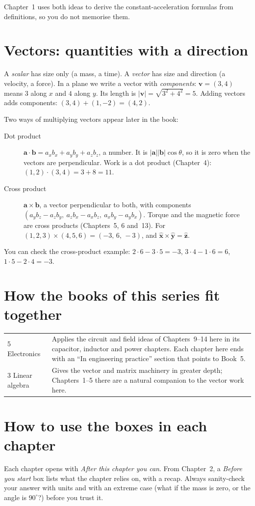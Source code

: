 Chapter~1 uses both ideas to derive the constant-acceleration formulas from
definitions, so you do not memorise them.

\section*{Vectors: quantities with a direction}

A \emph{scalar} has size only (a mass, a time). A \emph{vector} has size and
direction (a velocity, a force). In a plane we write a vector with
\emph{components}: $\mathbf v=(3,4)$ means $3$ along $x$ and $4$ along $y$. Its
length is $|\mathbf v|=\sqrt{3^{2}+4^{2}}=5$. Adding vectors adds components:
$(3,4)+(1,-2)=(4,2)$.

Two ways of multiplying vectors appear later in the book:
\begin{description}
\item[Dot product] $\mathbf a\cdot\mathbf b=a_xb_x+a_yb_y+a_zb_z$, a number. It
      is $|\mathbf a||\mathbf b|\cos\theta$, so it is zero when the vectors are
      perpendicular. Work is a dot product (Chapter~4): $(1,2)\cdot(3,4)=3+8=11$.
\item[Cross product] $\mathbf a\times\mathbf b$, a vector perpendicular to both,
      with components $(a_yb_z-a_zb_y,\ a_zb_x-a_xb_z,\ a_xb_y-a_yb_x)$. Torque and
      the magnetic force are cross products (Chapters~5, 6 and~13). For
      $(1,2,3)\times(4,5,6)=(-3,\,6,\,-3)$, and $\hat{\mathbf x}\times\hat{\mathbf y}=\hat{\mathbf z}$.
\end{description}
You can check the cross-product example: $2\cdot6-3\cdot5=-3$, $3\cdot4-1\cdot6=6$, $1\cdot5-2\cdot4=-3$.

\section*{How the books of this series fit together}

\begin{center}
\begin{tabular}{P{2.4cm}P{9.0cm}}
\toprule
{} & \\
 Electronics & Applies the circuit and field ideas of Chapters~9--14 here in its capacitor, inductor and power chapters. Each chapter here ends with an ``In engineering practice'' section that points to Book~5.\\
3 Linear algebra & Gives the vector and matrix machinery in greater depth; Chapters~1--5 there are a natural companion to the vector work here.\\
\bottomrule
\end{tabular}
\end{center}

\section*{How to use the boxes in each chapter}

Each chapter opens with \emph{After this chapter you can}. From Chapter~2, a
\emph{Before you start} box lists what the chapter relies on, with a recap.
Always sanity-check your answer with units and with an extreme case (what if the
mass is zero, or the angle is $90^\circ$?) before you trust it.
